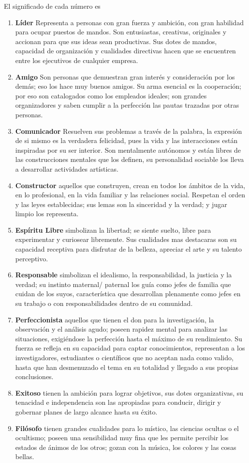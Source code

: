 El significado de cada número es
\begin{enumerate}
    \item \textbf{Líder} Representa a personas con gran fuerza y ambición, con gran habilidad para ocupar puestos de mandos. Son entusiastas, creativas, originales y accionan para que sus ideas sean productivas. Sus dotes de mandos, capacidad de organización y cualidades directivas hacen que se encuentren entre los ejecutivos de cualquier empresa.
    \item \textbf{Amigo} Son personas que demuestran gran interés y consideración por los demás; eso los hace muy buenos amigos. Su arma esencial es la cooperación; por eso son catalogados como los empleados ideales; son grandes organizadores y saben cumplir a la perfección las pautas trazadas por otras personas.
    \item \textbf{Comunicador} Resuelven sus problemas a través de la palabra, la expresión de si mismo es la verdadera felicidad, pues la vida y las interacciones están inspiradas por su ser interior. Son mentalmente autónomos y están libres de las construcciones mentales que los definen, su personalidad sociable los lleva a desarrollar actividades artísticas.
    \item \textbf{Constructor} aquellos que construyen, crean en todos los ámbitos de la vida, en lo profesional, en la vida familiar y las relaciones social. Respetan el orden y las leyes establecidas; sus lemas son la sinceridad y la verdad; y jugar limpio los representa.
    \item \textbf{Espíritu Libre} simbolizan la libertad; se siente suelto, libre para experimentar y curiosear libremente. Sus cualidades mas destacaras son su capacidad receptiva para disfrutar de la belleza, apreciar el arte y su talento perceptivo.
    \item \textbf{Responsable} simbolizan el idealismo, la responsabilidad, la justicia y la verdad; su instinto maternal/ paternal los guía como jefes de familia que cuidan de los suyos, característica que desarrollan plenamente como jefes en su trabajo o con responsabilidades dentro de su comunidad.
    \item \textbf{Perfeccionista} aquellos que tienen el don para la investigación, la observación y el análisis agudo; poseen rapidez mental para analizar las situaciones, exigiéndose la perfección hasta el máximo de su rendimiento. Su fuerza se refleja en su capacidad para captar conocimientos, representan a los investigadores, estudiantes o científicos que no aceptan nada como valido, hasta que han desmenuzado el tema en su totalidad y llegado a sus propias conclusiones.
    \item \textbf{Exitoso}  tienen la ambición para lograr objetivos, sus dotes organizativas, su tenacidad e independencia son las apropiadas para conducir, dirigir y gobernar planes de largo alcance hasta su éxito.
    \item \textbf{Filósofo}  tienen grandes cualidades para lo místico, las ciencias ocultas o el ocultismo; poseen una sensibilidad muy fina que les permite percibir los estados de ánimos de los otros; gozan con la música, los colores y las cosas bellas.
\end{enumerate}

